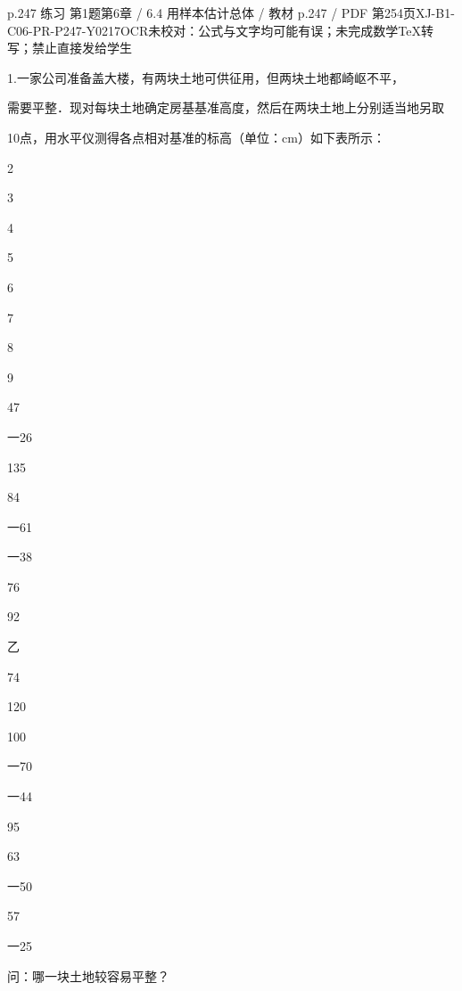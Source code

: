 \begin{bankitem}{p.247 练习 第1题}{第6章 / 6.4 用样本估计总体 / 教材 p.247 / PDF 第254页}{XJ-B1-C06-PR-P247-Y0217}{OCR未校对：公式与文字均可能有误；未完成数学TeX转写；禁止直接发给学生}
\begin{ocrdraft}
\par
1.一家公司准备盖大楼，有两块土地可供征用，但两块土地都崎岖不平，
\par
需要平整．现对每块土地确定房基基准高度，然后在两块土地上分别适当地另取
\par
10点，用水平仪测得各点相对基准的标高（单位：cm）如下表所示：
\par
2
\par
3
\par
4
\par
5
\par
6
\par
7
\par
8
\par
9
\par
47
\par
一26
\par
135
\par
84
\par
一61
\par
一38
\par
76
\par
92
\par
乙
\par
74
\par
120
\par
100
\par
一70
\par
一44
\par
95
\par
63
\par
一50
\par
57
\par
一25
\par
问：哪一块土地较容易平整？
\end{ocrdraft}
\end{bankitem}

